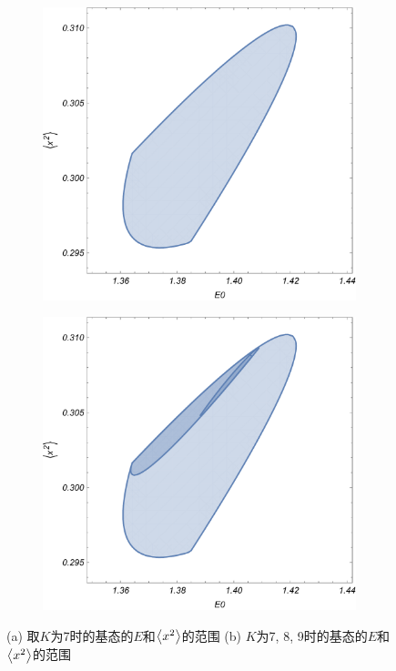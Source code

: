 \documentclass[oneside]{fduthesis}
\begin{document}
\begin{figure}
    \centering
    \begin{subfigure}{0.48\textwidth}
        \includegraphics[width=\textwidth]{nonlinear-oscillator-nonlinear-sdp-k-7-region.pdf}
        \subcaption{}
    \end{subfigure}
    \begin{subfigure}{0.48\textwidth}
        \includegraphics[width=\textwidth]{nonlinear-oscillator-nonlinear-sdp-k-7-8-9-region.pdf}
        \subcaption{}
    \end{subfigure}
    \caption{(a) 取$K$为7时的基态的$E$和$\expval{x^2}$的范围 (b) $K$为7, 8, 9时的基态的$E$和$\expval{x^2}$的范围}
    \label{fig:ground-state-e-x2-plot}
\end{figure}
\end{document}
